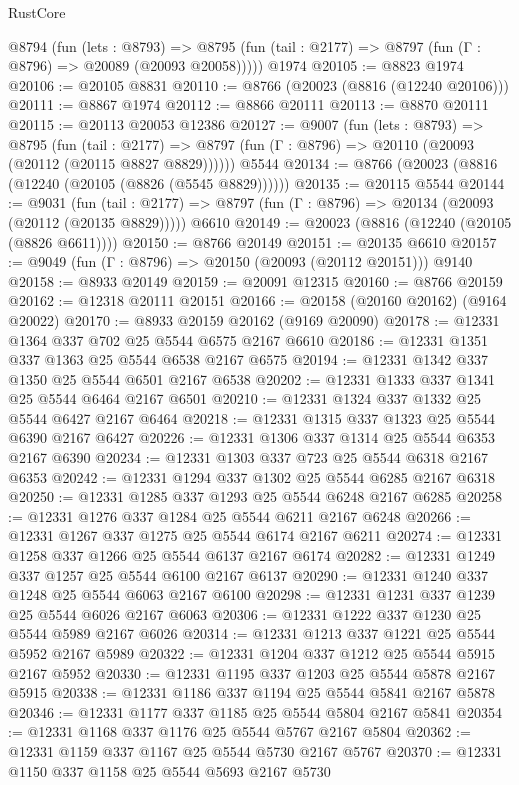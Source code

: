 \begin{lexlean}{RustCore}
\begin{coremodule}
    @8794
      (fun (lets : @8793) =>
      @8795 (fun (tail : @2177) => @8797 (fun (Γ : @8796) => @20089 (@20093 @20058)))))
    @1974
@20105 := @8823 @1974
@20106 := @20105 @8831
@20110 := @8766 (@20023 (@8816 (@12240 @20106)))
@20111 := @8867 @1974
@20112 := @8866 @20111
@20113 := @8870 @20111
@20115 := @20113 @20053 @12386
@20127 := @9007
    (fun (lets : @8793) =>
    @8795
      (fun (tail : @2177) =>
      @8797 (fun (Γ : @8796) => @20110 (@20093 (@20112 (@20115 @8827 @8829))))))
    @5544
@20134 := @8766 (@20023 (@8816 (@12240 (@20105 (@8826 (@5545 @8829))))))
@20135 := @20115 @5544
@20144 := @9031
    (fun (tail : @2177) => @8797 (fun (Γ : @8796) => @20134 (@20093 (@20112 (@20135 @8829)))))
    @6610
@20149 := @20023 (@8816 (@12240 (@20105 (@8826 @6611))))
@20150 := @8766 @20149
@20151 := @20135 @6610
@20157 := @9049 (fun (Γ : @8796) => @20150 (@20093 (@20112 @20151))) @9140
@20158 := @8933 @20149
@20159 := @20091 @12315
@20160 := @8766 @20159
@20162 := @12318 @20111 @20151
@20166 := @20158 (@20160 @20162) (@9164 @20022)
@20170 := @8933 @20159 @20162 (@9169 @20090)
@20178 := @12331 @1364 @337 @702 @25 @5544 @6575 @2167 @6610
@20186 := @12331 @1351 @337 @1363 @25 @5544 @6538 @2167 @6575
@20194 := @12331 @1342 @337 @1350 @25 @5544 @6501 @2167 @6538
@20202 := @12331 @1333 @337 @1341 @25 @5544 @6464 @2167 @6501
@20210 := @12331 @1324 @337 @1332 @25 @5544 @6427 @2167 @6464
@20218 := @12331 @1315 @337 @1323 @25 @5544 @6390 @2167 @6427
@20226 := @12331 @1306 @337 @1314 @25 @5544 @6353 @2167 @6390
@20234 := @12331 @1303 @337 @723 @25 @5544 @6318 @2167 @6353
@20242 := @12331 @1294 @337 @1302 @25 @5544 @6285 @2167 @6318
@20250 := @12331 @1285 @337 @1293 @25 @5544 @6248 @2167 @6285
@20258 := @12331 @1276 @337 @1284 @25 @5544 @6211 @2167 @6248
@20266 := @12331 @1267 @337 @1275 @25 @5544 @6174 @2167 @6211
@20274 := @12331 @1258 @337 @1266 @25 @5544 @6137 @2167 @6174
@20282 := @12331 @1249 @337 @1257 @25 @5544 @6100 @2167 @6137
@20290 := @12331 @1240 @337 @1248 @25 @5544 @6063 @2167 @6100
@20298 := @12331 @1231 @337 @1239 @25 @5544 @6026 @2167 @6063
@20306 := @12331 @1222 @337 @1230 @25 @5544 @5989 @2167 @6026
@20314 := @12331 @1213 @337 @1221 @25 @5544 @5952 @2167 @5989
@20322 := @12331 @1204 @337 @1212 @25 @5544 @5915 @2167 @5952
@20330 := @12331 @1195 @337 @1203 @25 @5544 @5878 @2167 @5915
@20338 := @12331 @1186 @337 @1194 @25 @5544 @5841 @2167 @5878
@20346 := @12331 @1177 @337 @1185 @25 @5544 @5804 @2167 @5841
@20354 := @12331 @1168 @337 @1176 @25 @5544 @5767 @2167 @5804
@20362 := @12331 @1159 @337 @1167 @25 @5544 @5730 @2167 @5767
@20370 := @12331 @1150 @337 @1158 @25 @5544 @5693 @2167 @5730

\end{coremodule}
\end{lexlean}
